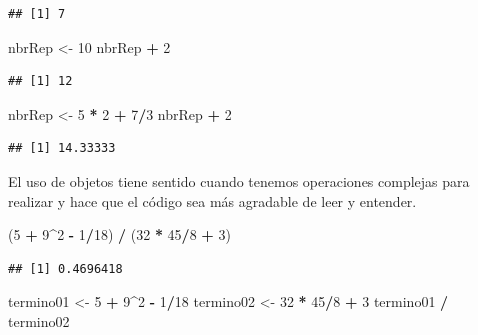 \documentclass[]{book}
\newenvironment{Shaded}{\begin{snugshade}}{\end{snugshade}}
\newcommand{\DecValTok}[1]{\textcolor[rgb]{0.00,0.00,0.81}{#1}}
\newcommand{\StringTok}[1]{\textcolor[rgb]{0.31,0.60,0.02}{#1}}
\newcommand{\OperatorTok}[1]{\textcolor[rgb]{0.81,0.36,0.00}{\textbf{#1}}}
\newcommand{\NormalTok}[1]{#1}
\begin{document}
\begin{verbatim}
## [1] 7
\end{verbatim}

\begin{Shaded}
\begin{Highlighting}[]
\NormalTok{nbrRep <-}\StringTok{ }\DecValTok{10}
\NormalTok{nbrRep }\OperatorTok{+}\StringTok{ }\DecValTok{2}
\end{Highlighting}
\end{Shaded}

\begin{verbatim}
## [1] 12
\end{verbatim}

\begin{Shaded}
\begin{Highlighting}[]
\NormalTok{nbrRep <-}\StringTok{ }\DecValTok{5} \OperatorTok{*}\StringTok{ }\DecValTok{2} \OperatorTok{+}\StringTok{ }\DecValTok{7}\OperatorTok{/}\DecValTok{3}
\NormalTok{nbrRep }\OperatorTok{+}\StringTok{ }\DecValTok{2}
\end{Highlighting}
\end{Shaded}

\begin{verbatim}
## [1] 14.33333
\end{verbatim}

El uso de objetos tiene sentido cuando tenemos operaciones complejas
para realizar y hace que el código sea más agradable de leer y entender.

\begin{Shaded}
\begin{Highlighting}[]
\NormalTok{(}\DecValTok{5} \OperatorTok{+}\StringTok{ }\DecValTok{9}\OperatorTok{^}\DecValTok{2} \OperatorTok{-}\StringTok{ }\DecValTok{1}\OperatorTok{/}\DecValTok{18}\NormalTok{) }\OperatorTok{/}\StringTok{ }\NormalTok{(}\DecValTok{32} \OperatorTok{*}\StringTok{ }\DecValTok{45}\OperatorTok{/}\DecValTok{8} \OperatorTok{+}\StringTok{ }\DecValTok{3}\NormalTok{)}
\end{Highlighting}
\end{Shaded}

\begin{verbatim}
## [1] 0.4696418
\end{verbatim}

\begin{Shaded}
\begin{Highlighting}[]
\NormalTok{termino01 <-}\StringTok{ }\DecValTok{5} \OperatorTok{+}\StringTok{ }\DecValTok{9}\OperatorTok{^}\DecValTok{2} \OperatorTok{-}\StringTok{ }\DecValTok{1}\OperatorTok{/}\DecValTok{18}
\NormalTok{termino02 <-}\StringTok{ }\DecValTok{32} \OperatorTok{*}\StringTok{ }\DecValTok{45}\OperatorTok{/}\DecValTok{8} \OperatorTok{+}\StringTok{ }\DecValTok{3}
\NormalTok{termino01 }\OperatorTok{/}\StringTok{ }\NormalTok{termino02}
\end{Highlighting}
\end{Shaded}
\end{document}
